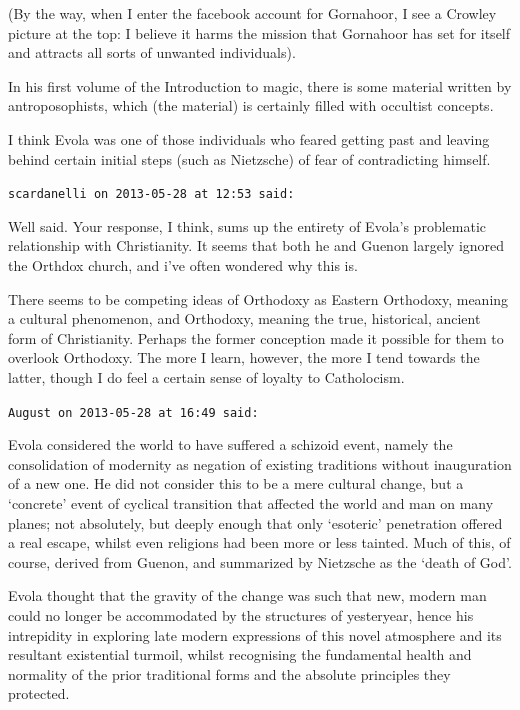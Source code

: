 \begin{footnotesize}
\begin{sffamily}
(By the way, when I enter the facebook account for Gornahoor, I see a Crowley picture at the top: I believe it harms the mission that Gornahoor has set for itself and attracts all sorts of unwanted individuals). 

In his first volume of the Introduction to magic, there is some material written by antroposophists, which (the material) is certainly filled with occultist concepts.

I think Evola was one of those individuals who feared getting past and leaving behind certain initial steps (such as Nietzsche) of fear of contradicting himself.


\hfill

\texttt{scardanelli on 2013-05-28 at 12:53 said: }

Well said. Your response, I think, sums up the entirety of Evola's problematic relationship with Christianity. It seems that both he and Guenon largely ignored the Orthdox church, and i've often wondered why this is. 

There seems to be competing ideas of Orthodoxy as Eastern Orthodoxy, meaning a cultural phenomenon, and Orthodoxy, meaning the true, historical, ancient form of Christianity. Perhaps the former conception made it possible for them to overlook Orthodoxy. The more I learn, however, the more I tend towards the latter, though I do feel a certain sense of loyalty to Catholocism.


\hfill

\texttt{August on 2013-05-28 at 16:49 said: }

Evola considered the world to have suffered a schizoid event, namely the consolidation of modernity as negation of existing traditions without inauguration of a new one. He did not consider this to be a mere cultural change, but a `concrete' event of cyclical transition that affected the world and man on many planes; not absolutely, but deeply enough that only `esoteric' penetration offered a real escape, whilst even religions had been more or less tainted. Much of this, of course, derived from Guenon, and summarized by Nietzsche as the `death of God'.

Evola thought that the gravity of the change was such that new, modern man could no longer be accommodated by the structures of yesteryear, hence his intrepidity in exploring late modern expressions of this novel atmosphere and its resultant existential turmoil, whilst recognising the fundamental health and normality of the prior traditional forms and the absolute principles they protected.



\end{sffamily}
\end{footnotesize}
